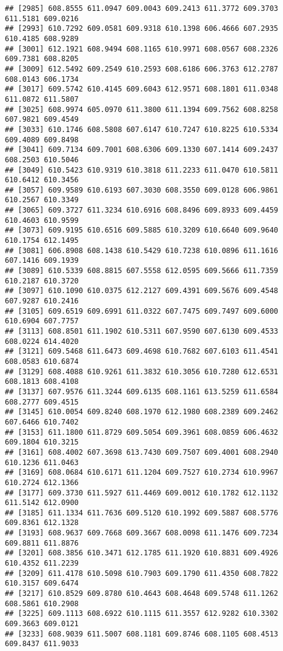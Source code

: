 \documentclass[
]{article}
\begin{document}
\begin{verbatim}
## [2985] 608.8555 611.0947 609.0043 609.2413 611.3772 609.3703 611.5181 609.0216
## [2993] 610.7292 609.0581 609.9318 610.1398 606.4666 607.2935 610.4185 608.9289
## [3001] 612.1921 608.9494 608.1165 610.9971 608.0567 608.2326 609.7381 608.8205
## [3009] 612.5492 609.2549 610.2593 608.6186 606.3763 612.2787 608.0143 606.1734
## [3017] 609.5742 610.4145 609.6043 612.9571 608.1801 611.0348 611.0872 611.5807
## [3025] 608.9974 605.0970 611.3800 611.1394 609.7562 608.8258 607.9821 609.4549
## [3033] 610.1746 608.5808 607.6147 610.7247 610.8225 610.5334 609.4089 609.8498
## [3041] 609.7134 609.7001 608.6306 609.1330 607.1414 609.2437 608.2503 610.5046
## [3049] 610.5423 610.9319 610.3818 611.2233 611.0470 610.5811 610.6412 610.3456
## [3057] 609.9589 610.6193 607.3030 608.3550 609.0128 606.9861 610.2567 610.3349
## [3065] 609.3727 611.3234 610.6916 608.8496 609.8933 609.4459 610.4603 610.9599
## [3073] 609.9195 610.6516 609.5885 610.3209 610.6640 609.9640 610.1754 612.1495
## [3081] 606.8908 608.1438 610.5429 610.7238 610.0896 611.1616 607.1416 609.1939
## [3089] 610.5339 608.8815 607.5558 612.0595 609.5666 611.7359 610.2187 610.3720
## [3097] 610.1090 610.0375 612.2127 609.4391 609.5676 609.4548 607.9287 610.2416
## [3105] 609.6519 609.6991 611.0322 607.7475 609.7497 609.6000 610.6904 607.7757
## [3113] 608.8501 611.1902 610.5311 607.9590 607.6130 609.4533 608.0224 614.4020
## [3121] 609.5468 611.6473 609.4698 610.7682 607.6103 611.4541 608.0583 610.6874
## [3129] 608.4088 610.9261 611.3832 610.3056 610.7280 612.6531 608.1813 608.4108
## [3137] 607.9576 611.3244 609.6135 608.1161 613.5259 611.6584 608.2777 609.4515
## [3145] 610.0054 609.8240 608.1970 612.1980 608.2389 609.2462 607.6466 610.7402
## [3153] 611.1800 611.8729 609.5054 609.3961 608.0859 606.4632 609.1804 610.3215
## [3161] 608.4002 607.3698 613.7430 609.7507 609.4001 608.2940 610.1236 611.0463
## [3169] 608.0684 610.6171 611.1204 609.7527 610.2734 610.9967 610.2724 612.1366
## [3177] 609.3730 611.5927 611.4469 609.0012 610.1782 612.1132 611.5142 612.0900
## [3185] 611.1334 611.7636 609.5120 610.1992 609.5887 608.5776 609.8361 612.1328
## [3193] 608.9637 609.7668 609.3667 608.0098 611.1476 609.7234 609.8811 611.8876
## [3201] 608.3856 610.3471 612.1785 611.1920 610.8831 609.4926 610.4352 611.2239
## [3209] 611.4178 610.5098 610.7903 609.1790 611.4350 608.7822 610.3157 609.6474
## [3217] 610.8529 609.8780 610.4643 608.4648 609.5748 611.1262 608.5861 610.2908
## [3225] 609.1113 608.6922 610.1115 611.3557 612.9282 610.3302 609.3663 609.0121
## [3233] 608.9039 611.5007 608.1181 609.8746 608.1105 608.4513 609.8437 611.9033

\end{verbatim}
\end{document}
